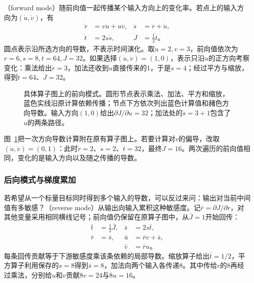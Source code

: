 （forward mode）随前向值一起传播某个输入方向上的变化率。若点上的输入方向为$(\dot u,\dot v)$，有
\begin{equation}
  \begin{aligned}
    \dot r&=v\dot u+u\dot v,&\dot s&=\dot r+\dot u,\\
    \dot t&=2s\dot s,&\dot J&=\tfrac12\dot t\text{。}
  \end{aligned}
  \label{eq:ffn-forward-mode}
\end{equation}
圆点表示沿所选方向的导数，不表示时间演化。取$u=2,v=3$，前向值依次为$r=6,s=8,t=64,J=32$。如果选择$(\dot u,\dot v)=(1,0)$，表示只沿$u$的正方向考察变化：乘法给出$\dot r=3$，加法还收到$u$直接传来的$1$，于是$\dot s=4$；经过平方与缩放，得到$\dot t=64$、$\dot J=32$。

\begin{figure}[htb]
  \centering
  
  \caption{具体算子图上的前向模式。圆形节点表示乘法、加法、平方和缩放，蓝色实线沿原计算依赖传播；节点下方依次列出蓝色计算值和赭色方向导数。输入方向$(1,0)$给出$\partial J/\partial u=32$；加法处的$\dot s=3+1$包含了$u$的两条路径。}
  \label{fig:ffn-autodiff-forward}
\end{figure}

图~\ref{fig:ffn-autodiff-forward}把一次方向导数计算附在原有算子图上。若要计算对$v$的偏导，改取$(\dot u,\dot v)=(0,1)$：此时$\dot r=2$、$\dot s=2$、$\dot t=32$，最终$\dot J=16$。两次遍历的前向值相同，变化的是输入方向以及随之传播的导数。

\FloatBarrier
\subsubsection{后向模式与梯度累加}
\label{sec:ffn-autodiff-reverse}

若希望从一个标量目标同时得到多个输入的导数，可以反过来问：输出对当前中间值有多敏感？（reverse mode）从输出向输入累积这种敏感度。记$\bar r=\partial J/\partial r$，对其他变量采用相同横线记号；前向值仍保留在原算子图中，从$\bar J=1$开始回传：
\begin{equation}
  \begin{aligned}
    \bar t&=\tfrac12\bar J,&\bar s&=2s\bar t,\\
    \bar r&=\bar s,&\bar u&=\bar r v+\bar s,\\
    &&\bar v&=\bar r u\text{。}
  \end{aligned}
  \label{eq:ffn-reverse-mode}
\end{equation}
每条回传贡献等于下游敏感度乘该条依赖的局部导数。缩放算子给出$\bar t=1/2$，平方算子利用保存的$s=8$得到$\bar s=8$，加法向两个输入各传递$8$。其中传给$r$的$8$再经过乘法，分别给$u$和$v$贡献$8v=24$与$8u=16$。


